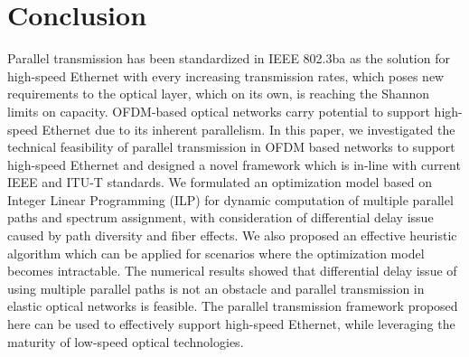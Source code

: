 \documentclass[conference]{IEEEtran}
\begin{document}
\section{Conclusion}\label{conclusion}
\par Parallel transmission has been standardized in IEEE 802.3ba as the solution for high-speed Ethernet with every increasing transmission rates, which poses new requirements to the optical layer, which on its own, is reaching the Shannon limits on capacity. OFDM-based optical networks carry potential to support high-speed Ethernet due to its inherent parallelism. In this paper, we investigated the technical feasibility of parallel transmission in OFDM based networks to support high-speed Ethernet and designed a novel framework which is in-line with current IEEE and ITU-T standards. We formulated an optimization model based on Integer Linear Programming (ILP) for dynamic computation of multiple parallel paths and spectrum assignment, with consideration of differential delay issue caused by path diversity and fiber effects.  We also proposed an effective heuristic algorithm which can be applied for scenarios where the optimization model becomes intractable. The numerical results showed that differential delay issue of using multiple parallel paths is not an obstacle and parallel transmission in elastic optical networks is feasible. The parallel transmission framework proposed here can be used to effectively support high-speed Ethernet, while leveraging the maturity of low-speed optical technologies.


 
 


   
         
 
\end{document}
